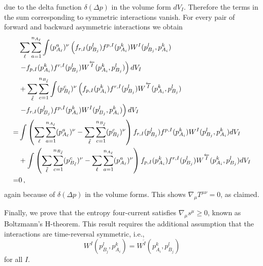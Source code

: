due to the delta function $\delta(\Delta p)$ in the volume form $dV_I$.  Therefore the terms in the sum  corresponding to symmetric interactions vanish.  For every pair of forward and backward asymmetric interactions we obtain
\begin{align}
&\sum_\ell\sum_{a=1}^{n_{A_\ell}}\int (p_{A_\ell}^a)^{\nu}\left(f_{r,I}(p_{B_j}^l)f^{p,I}(p_{A_i}^k)W^I(p_{B_j}^l,p_{A_i}^k) \right.\\
&\left. -f_{p,I}(p_{A_i}^k)f^{r,I}(p_{B_j}^l)W^{\overleftarrow{I}}(p_{A_i}^k,p_{B_j}^l)\right)  dV_I\notag\\
&+\sum_{\tilde\ell}\sum_{c=1}^{n_{B_{\tilde\ell}}} \int (p_{B_{\tilde\ell}}^c)^{\nu}\left(f_{p,I}(p_{A_i}^k)f^{r,I}(p_{B_j}^l)W^{\overleftarrow{I}}(p_{A_i}^k,p_{B_j}^l) \right.\notag\\
&\left. -f_{r,I}(p_{B_j}^l)f^{p,I}(p_{A_i}^k)W^I(p_{B_j}^l,p_{A_i}^k)\right)  dV_I\notag\\
=&\int\left( \sum_\ell\sum_{a=1}^{n_{A_\ell}}(p_{A_\ell}^a)^{\nu} -\sum_{\tilde \ell}\sum_{c=1}^{n_{B_{\tilde\ell}}} (p_{B_{\tilde\ell}}^c)^{\nu}\right)f_{r,I}(p_{B_j}^l)f^{p,I}(p_{A_i}^k)W^I(p_{B_j}^l,p_{A_i}^k)  dV_I\notag\\
&+\int \left(\sum_{\tilde\ell}\sum_{c=1}^{n_{B_{\tilde\ell}}}(p_{B_{\tilde\ell}}^c)^{\nu}-\sum_\ell\sum_{a=1}^{n_{A_\ell}}(p_{A_\ell}^a)^{\nu}\right)f_{p,I}(p_{A_i}^k)f^{r,I}(p_{B_j}^l)W^{\overleftarrow{I}}(p_{A_i}^k,p_{B_j}^l) dV_I\notag\\
=&0\,,\notag
\end{align}
again because of $\delta(\Delta p)$ in the volume forms.  This shows $\nabla_\mu T^{\mu\nu}=0$, as claimed.

Finally, we prove that the entropy four-current satisfies $\nabla_\mu s^\mu\geq 0$, known as Boltzmann's H-theorem. This result requires the additional assumption that the interactions are time-reversal symmetric,  i.e.,
\begin{equation}\label{time_symmetry}
W^I(p_{B_j}^l,p_{A_i}^k)=W^{\overleftarrow{I}}(p_{A_i}^k,p_{B_j}^l)
\end{equation}
for all $I$.  

